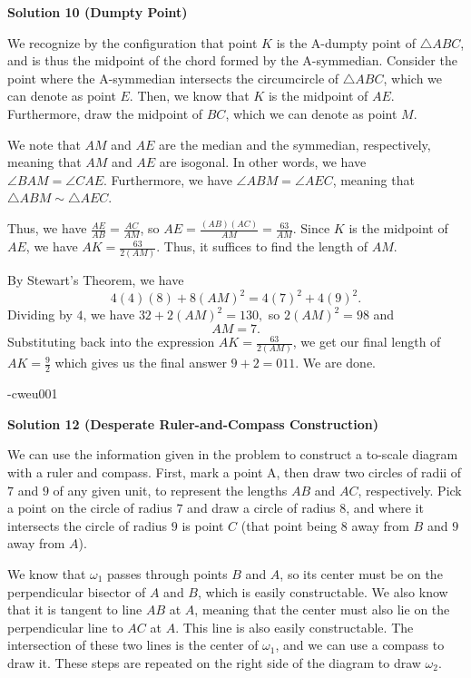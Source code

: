\begin{enumerate}
 



\textbf{Solution 10 (Dumpty Point)}

We recognize by the configuration that point $K$ is the A-dumpty point of $\triangle ABC$, and is thus the midpoint of the chord formed by the A-symmedian. Consider the point where the A-symmedian intersects the circumcircle of $\triangle ABC$, which we can denote as point $E$. Then, we know that $K$ is the midpoint of $AE$. Furthermore, draw the midpoint of $BC$, which we can denote as point $M$. 

 We note that $AM$ and $AE$ are the median and the symmedian, respectively, meaning that $AM$ and $AE$ are isogonal. In other words, we have $\angle BAM = \angle CAE$. Furthermore, we have $\angle ABM = \angle AEC$, meaning that $\triangle ABM \sim \triangle AEC$.

 
Thus, we have $\frac{AE}{AB} = \frac{AC}{AM}$, so $AE = \frac{(AB)(AC)}{AM} = \frac{63}{AM}$. Since $K$ is the midpoint of $AE$, we have $AK = \frac{63}{2(AM)}$. Thus, it suffices to find the length of $AM$. 

 
By Stewart's Theorem, we have 
 \[4(4)(8)+8(AM)^2 = 4(7)^2+4(9)^2.\] Dividing by $4$, we have $32+2(AM)^2 = 130,$ so $2(AM)^2 = 98$ and 
 \[AM = 7.\] Substituting back into the expression $AK = \frac{63}{2(AM)}$, we get our final length of $AK = \boxed{\frac{9}{2}}$ which gives us the final answer $9+2 = \boxed{011}$. We are done. 

 -cweu001

 



\textbf{Solution 12 (Desperate Ruler-and-Compass Construction)}

We can use the information given in the problem to construct a to-scale diagram with a ruler and compass. First, mark a point A, then draw two circles of radii of $7$ and $9$ of any given unit, to represent the lengths $AB$ and $AC$, respectively. Pick a point on the circle of radius $7$ and draw a circle of radius $8$, and where it intersects the circle of radius $9$ is point $C$ (that point being $8$ away from $B$ and $9$ away from $A$).

 We know that $\omega_1$ passes through points $B$ and $A$, so its center must be on the perpendicular bisector of $A$ and $B$, which is easily constructable. We also know that it is tangent to line $AB$ at $A$, meaning that the center must also lie on the perpendicular line to $AC$ at $A$. This line is also easily constructable. The intersection of these two lines is the center of $\omega_1$, and we can use a compass to draw it. These steps are repeated on the right side of the diagram to draw $\omega_2$.


\end{enumerate}
